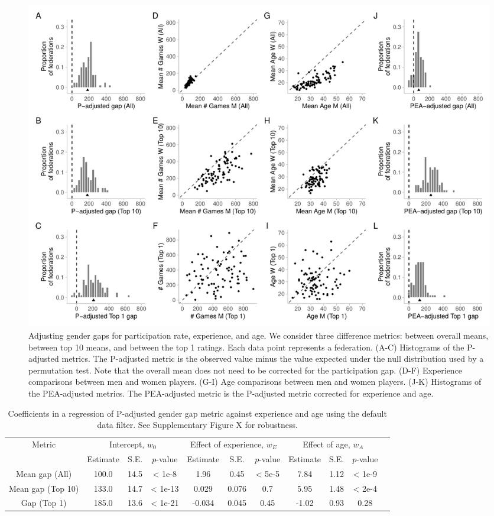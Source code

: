 \documentclass[9pt,twocolumn,twoside,lineno]{pnas-new}
\begin{document}
\begin{figure}[!ht]
    \centering
        \includegraphics[width = \linewidth]{fig_3_w_jun_no_ina.pdf}
    \caption{Adjusting gender gaps for participation rate, experience, and age. We consider three difference metrics: between overall means, between top 10 means, and between the top 1 ratings. Each data point represents a federation. (A-C) Histograms of the P-adjusted metrics.
 The P-adjusted metric is the observed value minus the value expected under the null distribution used by a permutation test. Note that the overall mean does not need to be corrected for the participation gap. (D-F)  Experience comparisons between men and women players.  (G-I) Age comparisons between men and women players.  (J-K) Histograms of the PEA-adjusted metrics.
 The PEA-adjusted metric is the P-adjusted metric corrected for experience and age.}
    \label{fig:PEA}
\end{figure}

\begin{table}[t!]
\centering
\begin{tabular}{|c|c|c|c|c|c|c|c|c|c|c|}
\hline
\multirow{ 2}{*}{Metric} & \multicolumn{3}{c|}{Intercept, $w_0$} & \multicolumn{3}{c|}{Effect of experience, $w_E$} & \multicolumn{3}{c|}{Effect of age, $w_A$} \\
\cline{2-10}
  & Estimate & S.E. & $p$-value  & Estimate  & S.E. &   $p$-value  & Estimate  & S.E. &   $p$-value \\
\hline
Mean gap (All) & 100.0 & 14.5 & < 1e-8 & 1.96 & 0.45 & < 5e-5 & 7.84 & 1.12 & < 1e-9\\
\hline
Mean gap (Top 10) & 133.0 & 14.7 & < 1e-13 & 0.029 & 0.076 & 0.7 & 5.95 & 1.48 & < 2e-4\\
\hline
Gap (Top 1) & 185.0 & 13.6 & < 1e-21 & -0.034 & 0.045 & 0.45 & -1.02 & 0.93 & 0.28\\
\hline
\end{tabular}
\caption{Coefficients in a regression of P-adjusted gender gap metric against experience and age using the default data filter. See Supplementary Figure X for robustness.} \label{table:weighted-reg}
\end{table}
\end{document}
